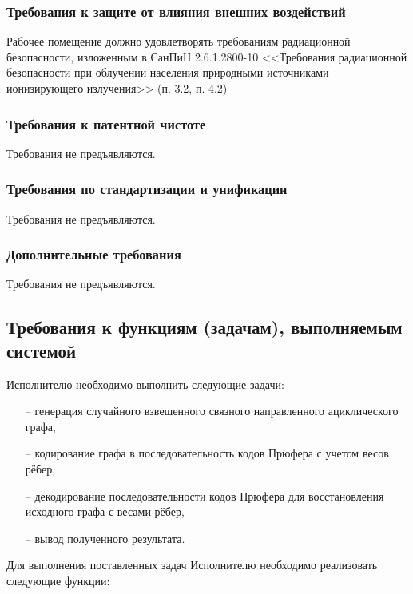 \documentclass[12pt,a4paper]{article}
\begin{document}
\subsubsection{Требования к защите от влияния внешних воздействий}
Рабочее помещение должно удовлетворять требованиям радиационной безопасности, изложенным в СанПиН 2.6.1.2800-10 
<<Требования радиационной  безопасности при облучении населения природными источниками ионизирующего излучения>> 
(п. 3.2, п. 4.2)

\subsubsection{Требования к патентной чистоте}
Требования не предъявляются.

\subsubsection{Требования по стандартизации и унификации}
Требования не предъявляются.

\subsubsection{Дополнительные требования}
Требования не предъявляются.

\subsection{Требования к функциям (задачам), выполняемым системой} \label{functions}
Исполнителю необходимо выполнить следующие задачи:
\begin{itemize} 
    \item[--] генерация случайного взвешенного связного направленного ациклического графа,
    \item[--] кодирование графа в последовательность кодов Прюфера с учетом весов рёбер, 
    \item[--] декодирование последовательности кодов Прюфера для восстановления исходного графа с весами рёбер, 
    \item[--] вывод полученного результата.
\end{itemize}

Для выполнения поставленных задач Исполнителю необходимо реализовать следующие функции:
\end{document}
